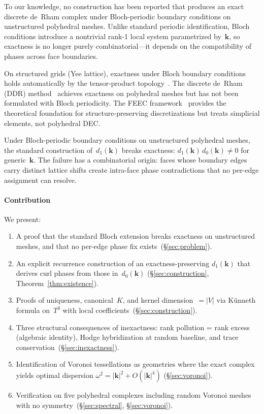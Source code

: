 \documentclass[12pt]{article}
\theoremstyle{definition}
\theoremstyle{remark}
\newcommand{\kk}{\mathbf{k}}
\begin{document}
To our knowledge, no construction has been reported that produces an exact
discrete de~Rham complex under Bloch-periodic boundary conditions on
unstructured polyhedral meshes. Unlike standard periodic identification,
Bloch conditions introduce a nontrivial rank-1 local system parametrized
by~$\kk$, so exactness is no longer purely combinatorial---it depends on the
compatibility of phases across face boundaries.

On structured grids (Yee lattice), exactness under Bloch boundary conditions
holds automatically by the tensor-product
topology~\cite{Teixeira1999,Schulz2018,Monkola2023}. The discrete de~Rham
(DDR) method~\cite{DiPietro2020} achieves exactness on polyhedral meshes but
has not been formulated with Bloch periodicity. The FEEC
framework~\cite{Arnold2006,Arnold2010} provides the theoretical foundation for
structure-preserving discretizations but treats simplicial elements, not
polyhedral DEC.

Under Bloch-periodic boundary conditions on unstructured polyhedral meshes, the
standard construction of~$d_1(\kk)$ breaks exactness:
$d_1(\kk)\,d_0(\kk) \neq 0$ for generic~$\kk$. The failure has a combinatorial
origin: faces whose boundary edges carry distinct lattice shifts create
intra-face phase contradictions that no per-edge assignment can resolve.

\paragraph{Contribution} We present:
\begin{enumerate}
  \item A proof that the standard Bloch extension breaks exactness on
    unstructured meshes, and that no per-edge phase fix
    exists~(\S\ref{sec:problem}).
  \item An explicit recurrence construction of an exactness-preserving
    $d_1(\kk)$ that derives curl phases from those in~$d_0(\kk)$
    (\S\ref{sec:construction}, Theorem~\ref{thm:existence}).
  \item Proofs of uniqueness, canonical~$K$, and kernel dimension~$= |V|$
    via K\"unneth formula on~$T^3$ with local
    coefficients~(\S\ref{sec:construction}).
  \item Three structural consequences of inexactness: rank pollution = rank
    excess (algebraic identity), Hodge hybridization at random baseline, and
    trace conservation~(\S\ref{sec:inexactness}).
  \item Identification of Voronoi tessellations as geometries where the exact
    complex yields optimal dispersion $\omega^2 = |\kk|^2 + O(|\kk|^4)$
    (\S\ref{sec:voronoi}).
  \item Verification on five polyhedral complexes including random Voronoi
    meshes with no symmetry~(\S\ref{sec:spectral}, \S\ref{sec:voronoi}).
\end{enumerate}
\end{document}
